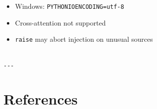 \begin{itemize}
\item Windows: \texttt{PYTHONIOENCODING=utf-8}
\item Cross-attention not supported
\item \texttt{raise} may abort injection on unusual sources
\end{itemize}
\begin{lstlisting}

---
\end{lstlisting}


\section{References}

